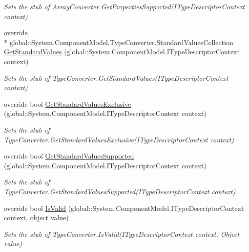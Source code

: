 \begin{DoxyCompactItemize}
\begin{DoxyCompactList}\small\item\em Sets the stub of Array\-Converter.\-Get\-Properties\-Supported(\-I\-Type\-Descriptor\-Context context)\end{DoxyCompactList}\item 
override \\*
global\-::\-System.\-Component\-Model.\-Type\-Converter.\-Standard\-Values\-Collection \hyperlink{class_system_1_1_component_model_1_1_fakes_1_1_stub_array_converter_abe31a6382ef84ac2dd45c1f7f60bd975}{Get\-Standard\-Values} (global\-::\-System.\-Component\-Model.\-I\-Type\-Descriptor\-Context context)
\begin{DoxyCompactList}\small\item\em Sets the stub of Type\-Converter.\-Get\-Standard\-Values(\-I\-Type\-Descriptor\-Context context)\end{DoxyCompactList}\item 
override bool \hyperlink{class_system_1_1_component_model_1_1_fakes_1_1_stub_array_converter_a8cda177148a098bbc038c5e781271e7d}{Get\-Standard\-Values\-Exclusive} (global\-::\-System.\-Component\-Model.\-I\-Type\-Descriptor\-Context context)
\begin{DoxyCompactList}\small\item\em Sets the stub of Type\-Converter.\-Get\-Standard\-Values\-Exclusive(\-I\-Type\-Descriptor\-Context context)\end{DoxyCompactList}\item 
override bool \hyperlink{class_system_1_1_component_model_1_1_fakes_1_1_stub_array_converter_a91d1adfd7fdc92bfe34b96ea4f028761}{Get\-Standard\-Values\-Supported} (global\-::\-System.\-Component\-Model.\-I\-Type\-Descriptor\-Context context)
\begin{DoxyCompactList}\small\item\em Sets the stub of Type\-Converter.\-Get\-Standard\-Values\-Supported(\-I\-Type\-Descriptor\-Context context)\end{DoxyCompactList}\item 
override bool \hyperlink{class_system_1_1_component_model_1_1_fakes_1_1_stub_array_converter_a701242e32c2f9b0dfa39e9baf78ec6b9}{Is\-Valid} (global\-::\-System.\-Component\-Model.\-I\-Type\-Descriptor\-Context context, object value)
\begin{DoxyCompactList}\small\item\em Sets the stub of Type\-Converter.\-Is\-Valid(\-I\-Type\-Descriptor\-Context context, Object value)\end{DoxyCompactList}\end{DoxyCompactItemize}
